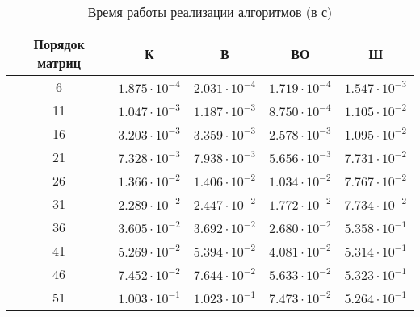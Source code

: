 \begin{table}[h]
	\begin{center}
		\begin{threeparttable}
			\captionsetup{justification=raggedright,singlelinecheck=off}
			\caption{Время работы реализации алгоритмов (в с)}
			\label{tbl:time_measurements}
			\begin{tabular}{|c|c|c|c|c|}
				\hline
				Порядок матриц &  К  & В & ВО & Ш \\
				\hline
			6 &$ 1.875 \cdot 10^{-4} $&$ 2.031\cdot 10^{-4} $&$ 1.719\cdot 10^{-4} $&$ 1.547\cdot 10^{-3}$\\
			\hline
			11 &$ 1.047\cdot 10^{-3} $&$ 1.187\cdot 10^{-3} $&$ 8.750\cdot 10^{-4} $&$ 1.105\cdot 10^{-2}$\\
			\hline
			16 &$ 3.203\cdot 10^{-3} $&$ 3.359\cdot 10^{-3} $&$ 2.578\cdot 10^{-3} $&$ 1.095\cdot 10^{-2}$\\
			\hline
			21 &$ 7.328\cdot 10^{-3} $&$ 7.938\cdot 10^{-3} $&$ 5.656\cdot 10^{-3} $&$ 7.731\cdot 10^{-2}$\\
			\hline
			26 &$ 1.366\cdot 10^{-2} $&$ 1.406\cdot 10^{-2} $&$ 1.034\cdot 10^{-2} $&$ 7.767\cdot 10^{-2}$\\
			\hline
			31 &$ 2.289\cdot 10^{-2} $&$ 2.447\cdot 10^{-2} $&$ 1.772\cdot 10^{-2} $&$ 7.734\cdot 10^{-2}$\\
			\hline
			36 &$ 3.605\cdot 10^{-2} $&$ 3.692\cdot 10^{-2} $&$ 2.680\cdot 10^{-2} $&$ 5.358\cdot 10^{-1}$\\
			\hline
			41 &$ 5.269\cdot 10^{-2} $&$ 5.394\cdot 10^{-2} $&$ 4.081\cdot 10^{-2} $&$ 5.314\cdot 10^{-1}$\\
			\hline
			46 &$ 7.452\cdot 10^{-2} $&$ 7.644\cdot 10^{-2} $&$ 5.633\cdot 10^{-2} $&$ 5.323\cdot 10^{-1}$\\
			\hline
			51 &$ 1.003\cdot 10^{-1} $&$ 1.023\cdot 10^{-1} $&$ 7.473\cdot 10^{-2} $&$ 5.264\cdot 10^{-1}$\\
			\hline
			\end{tabular}
		\end{threeparttable}
	\end{center}
\end{table}

